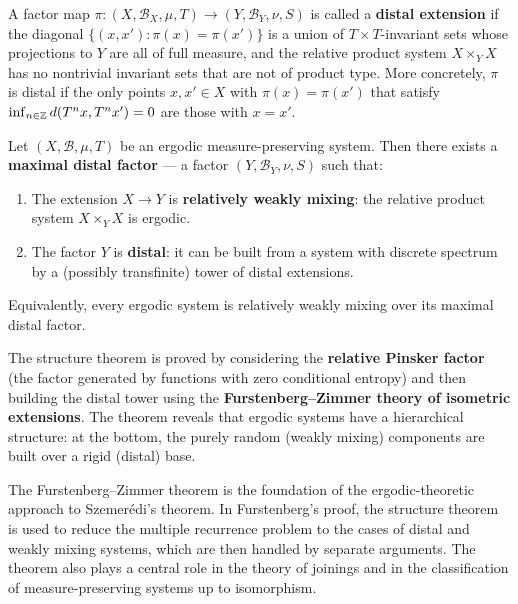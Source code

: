 \begin{definition}
A factor map \(\pi: (X,\mathscr{B}_X,\mu,T) \to (Y,\mathscr{B}_Y,\nu,S)\) is called a \textbf{distal extension} if the diagonal \(\{(x,x') : \pi(x) = \pi(x')\}\) is a union of \(T \times T\)-invariant sets whose projections to \(Y\) are all of full measure, and the relative product system \(X \times_Y X\) has no nontrivial invariant sets that are not of product type. More concretely, \(\pi\) is distal if the only points \(x,x' \in X\) with \(\pi(x) = \pi(x')\) that satisfy \(\inf_{n \in \mathbb{Z}} d(T^n x, T^n x') = 0\) are those with \(x = x'\).
\end{definition}

\begin{theorem}
Let \((X,\mathscr{B},\mu,T)\) be an ergodic measure-preserving system. Then there exists a \textbf{maximal distal factor} --- a factor \((Y,\mathscr{B}_Y,\nu,S)\) such that:
\begin{enumerate}
    \item The extension \(X \to Y\) is \textbf{relatively weakly mixing}: the relative product system \(X \times_Y X\) is ergodic.
    \item The factor \(Y\) is \textbf{distal}: it can be built from a system with discrete spectrum by a (possibly transfinite) tower of distal extensions.
\end{enumerate}
Equivalently, every ergodic system is relatively weakly mixing over its maximal distal factor.
\end{theorem}

The structure theorem is proved by considering the \textbf{relative Pinsker factor} (the factor generated by functions with zero conditional entropy) and then building the distal tower using the \textbf{Furstenberg--Zimmer theory of isometric extensions}. The theorem reveals that ergodic systems have a hierarchical structure: at the bottom, the purely random (weakly mixing) components are built over a rigid (distal) base.

The Furstenberg--Zimmer theorem is the foundation of the ergodic-theoretic approach to Szemer\'edi's theorem. In Furstenberg's proof, the structure theorem is used to reduce the multiple recurrence problem to the cases of distal and weakly mixing systems, which are then handled by separate arguments. The theorem also plays a central role in the theory of joinings and in the classification of measure-preserving systems up to isomorphism.

